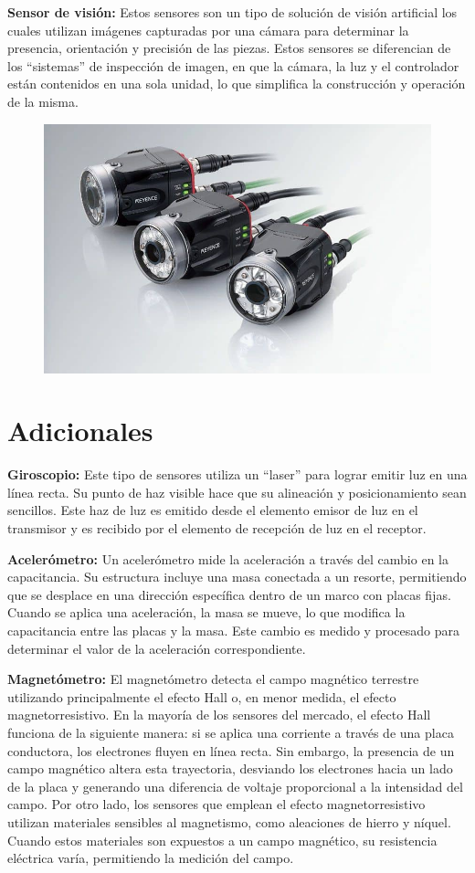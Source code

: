 \textbf{Sensor de visión: }
Estos sensores son un tipo de solución de visión artificial los cuales utilizan imágenes capturadas por una cámara para determinar la presencia, orientación y  precisión de las piezas. Estos sensores se diferencian de los “sistemas” de inspección de imagen, en que la cámara, la luz y el controlador están contenidos en una sola unidad, lo que simplifica la construcción y operación de la misma.

\begin{figure}[h]
	\centering
	\includegraphics[width=0.4\linewidth, height=0.2\textwidth]{img/vision}
	\caption{}
	\label{fig:vision}
\end{figure} 

\section{Adicionales}
\textbf{Giroscopio:}
Este tipo de sensores utiliza un “laser” para lograr emitir luz en una línea recta. Su punto de haz visible hace que su alineación y posicionamiento sean sencillos. Este haz de luz es emitido desde el elemento emisor de luz en el transmisor y es recibido por el elemento de recepción de luz en el receptor. 
\vspace{10pt}  %


\textbf{Acelerómetro:}
Un acelerómetro mide la aceleración a través del cambio en la capacitancia. Su estructura incluye una masa conectada a un resorte, permitiendo que se desplace en una dirección específica dentro de un marco con placas fijas. Cuando se aplica una aceleración, la masa se mueve, lo que modifica la capacitancia entre las placas y la masa. Este cambio es medido y procesado para determinar el valor de la aceleración correspondiente.
\vspace{10pt}  %

\textbf{Magnetómetro:}
El magnetómetro detecta el campo magnético terrestre utilizando principalmente el efecto Hall o, en menor medida, el efecto magnetorresistivo. En la mayoría de los sensores del mercado, el efecto Hall funciona de la siguiente manera: si se aplica una corriente a través de una placa conductora, los electrones fluyen en línea recta. Sin embargo, la presencia de un campo magnético altera esta trayectoria, desviando los electrones hacia un lado de la placa y generando una diferencia de voltaje proporcional a la intensidad del campo. Por otro lado, los sensores que emplean el efecto magnetorresistivo utilizan materiales sensibles al magnetismo, como aleaciones de hierro y níquel. Cuando estos materiales son expuestos a un campo magnético, su resistencia eléctrica varía, permitiendo la medición del campo.
\vspace{10pt}  %



